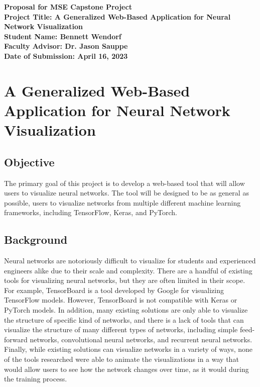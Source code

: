 \documentclass[letterpaper, 12pt]{report}
\begin{document}
\begin{titlepage}
	\begin{center}
		\vspace*{2in}
		\begin{doublespace}
			\LARGE \textbf{Proposal for MSE Capstone Project} \\
            \vspace*{0.5in}
			\large
            \textbf{Project Title: A Generalized Web-Based Application for Neural Network Visualization} \\
			\vspace*{0.5in}
			\textbf{Student Name: Bennett Wendorf} \\
            \textbf{Faculty Advisor: Dr. Jason Sauppe} \\
            \textbf{Date of Submission: April 16, 2023} \\
		\end{doublespace}
	\end{center}
\end{titlepage}

\section*{A Generalized Web-Based Application for Neural Network Visualization}

\subsection*{Objective}
The primary goal of this project is to develop a web-based tool that will allow users to visualize neural networks. The tool will be designed to be as general as possible, users to visualize networks from multiple different machine learning frameworks, including TensorFlow, Keras, and PyTorch. 

\subsection*{Background}
Neural networks are notoriously difficult to visualize for students and experienced engineers alike due to their scale and complexity. There are a handful of existing tools for visualizing neural networks, but they are often limited in their scope. For example, TensorBoard is a tool developed by Google for visualizing TensorFlow models. However, TensorBoard is not compatible with Keras or PyTorch models. In addition, many existing solutions are only able to visualize the structure of specific kind of networks, and there is a lack of tools that can visualize the structure of many different types of networks, including simple feed-forward networks, convolutional neural networks, and recurrent neural networks. Finally, while existing solutions can visualize networks in a variety of ways, none of the tools researched were able to animate the visualizations in a way that would allow users to see how the network changes over time, as it would during the training process.
\end{document}
